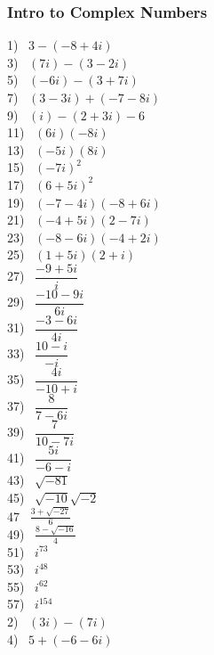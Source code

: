 \newpage

\subsubsection{Intro to Complex Numbers}

{}%

\begin{multicols}{2}
  1)~ $3 - (- 8 + 4 i)$\\
  3)~ $(7 i) - (3 - 2 i)$\\
  5)~ $(- 6 i) - (3 + 7 i)$\\
  7)~ $(3 - 3 i) + (- 7 - 8 i)$\\
  9)~ $(i) - (2 + 3 i) - 6$\\
  11)~ $(6 i) (- 8 i)$\\
  13)~ $(- 5 i) (8 i)$\\
  15)~ $(- 7 i)^2$\\
  17)~ $(6 + 5 i)^2$\\
  19)~ $(- 7 - 4 i) (- 8 + 6 i)$\\
  21)~ $(- 4 + 5 i) (2 - 7 i)$\\
  23)~ $(- 8 - 6 i) (- 4 + 2 i)$\\
  25)~ $(1 + 5 i) (2 + i)$\\
  27)~ $\dfrac{- 9 + 5 i}{i}$\\
  29)~ $\dfrac{- 10 - 9 i}{6 i}$\\
  31)~ $\dfrac{- 3 - 6 i}{4 i}$\\
  33)~ $\dfrac{10 - i}{- i}$\\
  35)~ $\dfrac{4 i}{- 10 + i}$\\
  37)~ $\dfrac{8}{7 - 6 i}$\\
  39)~ $\dfrac{7}{10 - 7 i}$\\
  41)~ $\dfrac{5 i}{- 6 - i}$\\
  43)~ $\sqrt{- 81}$\\
  45)~ $\sqrt{- 10} \sqrt{- 2}$\\
  47~ $\frac{3 + \sqrt{- 27}}{6}$\\
  49)~ $\frac{8 - \sqrt{- 16}}{4}$\\
  51)~ $i^{73}$\\
  53)~ $i^{48}$\\
  55)~ $i^{62}$\\
  57)~ $i^{154}$\\
  2)~ $(3 i) - (7 i)$\\
  4)~ $5 + (- 6 - 6 i)$\\

\end{multicols}
